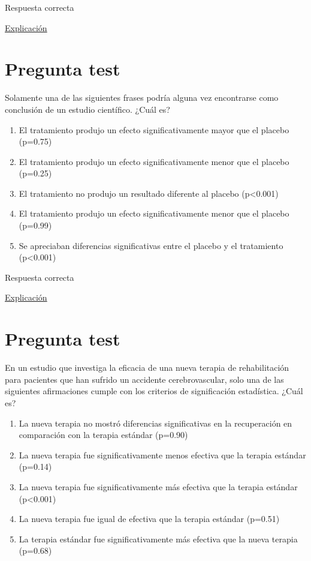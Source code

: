 \documentclass[
]{book}
\providecommand{\tightlist}{%
  \setlength{\itemsep}{0pt}\setlength{\parskip}{0pt}}
\begin{document}
Respuesta correcta

\href{https://homepage.divms.uiowa.edu/~mbognar/applets/normal.html}{Explicación}

\hypertarget{pregunta-test-117}{%
\section{Pregunta test}\label{pregunta-test-117}}

Solamente una de las siguientes frases podría alguna vez encontrarse como conclusión de un estudio científico. ¿Cuál es?

\begin{enumerate}
\def\labelenumi{\alph{enumi})}
\tightlist
\item
  El tratamiento produjo un efecto significativamente mayor que el placebo (p=0.75)
\item
  El tratamiento produjo un efecto significativamente menor que el placebo (p=0.25)
\item
  El tratamiento no produjo un resultado diferente al placebo (p\textless0.001)
\item
  El tratamiento produjo un efecto significativamente menor que el placebo (p=0.99)
\item
  Se apreciaban diferencias significativas entre el placebo y el tratamiento (p\textless0.001)
\end{enumerate}

Respuesta correcta

\href{https://1fjmanzano.github.io/bioestadistica/contrastes-de-hipo\%CC\%81tesis.html\#contrastes-bilaterales-y-unilaterales}{Explicación}

\hypertarget{pregunta-test-118}{%
\section{Pregunta test}\label{pregunta-test-118}}

En un estudio que investiga la eficacia de una nueva terapia de rehabilitación para pacientes que han sufrido un accidente cerebrovascular, solo una de las siguientes afirmaciones cumple con los criterios de significación estadística. ¿Cuál es?

\begin{enumerate}
\def\labelenumi{\alph{enumi})}
\tightlist
\item
  La nueva terapia no mostró diferencias significativas en la recuperación en comparación con la terapia estándar (p=0.90)
\item
  La nueva terapia fue significativamente menos efectiva que la terapia estándar (p=0.14)
\item
  La nueva terapia fue significativamente más efectiva que la terapia estándar (p\textless0.001)
\item
  La nueva terapia fue igual de efectiva que la terapia estándar (p=0.51)
\item
  La terapia estándar fue significativamente más efectiva que la nueva terapia (p=0.68)
\end{enumerate}
\end{document}
